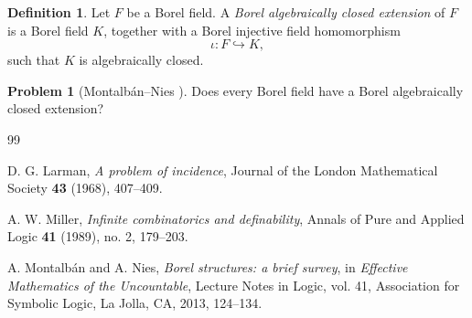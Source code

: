 \documentclass[11pt]{amsart}
\theoremstyle{definition}
\newtheorem{problem}{Problem}[section]
\newtheorem{definition}[theorem]{Definition}
\begin{document}
\begin{definition}
Let $F$ be a Borel field. A \emph{Borel algebraically closed extension} of $F$ is a Borel field $K$, together with a Borel injective field homomorphism
\[
\iota:F\hookrightarrow K,
\]
such that $K$ is algebraically closed.
\end{definition}

\begin{problem}[Montalb\'an--Nies {\cite[Question 2.8]{MontalbanNies2013}}]
Does every Borel field have a Borel algebraically closed extension?
\end{problem}

\begin{thebibliography}{99}

D. G. Larman,
\emph{A problem of incidence},
Journal of the London Mathematical Society
\textbf{43} (1968), 407--409.

A. W. Miller,
\emph{Infinite combinatorics and definability},
Annals of Pure and Applied Logic
\textbf{41} (1989), no. 2, 179--203.

A. Montalb\'an and A. Nies,
\emph{Borel structures: a brief survey},
in \emph{Effective Mathematics of the Uncountable},
Lecture Notes in Logic, vol. 41,
Association for Symbolic Logic, La Jolla, CA, 2013,
124--134.

\end{thebibliography}


\bigskip
\bigskip
\end{document}
